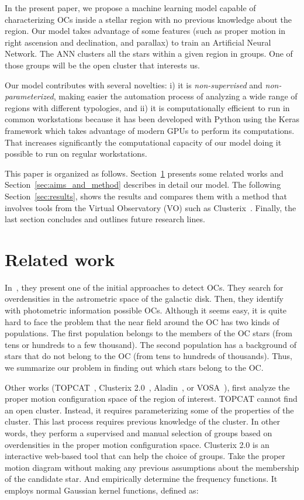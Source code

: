\documentclass[11pt,a4paper,english,twocolumn]{article}
\begin{document}
In the present paper, we propose a machine learning model capable of characterizing
OCs inside a stellar region with no previous knowledge about the region.
Our model takes advantage of some features (such as proper motion in right ascension
and declination, and parallax) to train an Artificial Neural Network.
The ANN clusters all the stars within a given region in groups.
One of those groups will be the open cluster that interests us.

Our model contributes with several novelties: i) it is \emph{non-supervised} and
\emph{non-parameterized}, making easier the automation process of analyzing a
wide range of regions with different typologies, and ii) it is computationally
efficient to run in common workstations because it has been developed with
Python using the Keras framework which takes advantage of modern GPUs to perform
its computations. That increases significantly the computational capacity of
our model doing it possible to run on regular workstations.

This paper is organized as follows. Section~\ref{sec:related_works} presents
some related works and Section~\ref{sec:aims_and_method} describes in detail
our model. The following Section~\ref{sec:results}, shows the results and compares
them with a method that involves tools from the Virtual Observatory (VO) such as
Clusterix~\cite{balaguer2020clusterix}. Finally, the last section concludes and
outlines future research lines.

\section{Related work}
\label{sec:related_works}

In~\cite{castro2020hunting}, they present one of the initial approaches to detect OCs.
They search for overdensities in the astrometric space of the galactic disk. Then,
they identify with photometric information possible OCs. Although it seems easy,
it is quite hard to face the problem that the near field around the OC has two kinds of
populations. The first population belongs to the members of the OC stars (from tens or
hundreds to a few thousand). The second population has a background of stars that do
not belong to the OC (from tens to hundreds of thousands). Thus, we summarize our problem
in finding out which stars belong to the OC.

Other works (TOPCAT~\cite{taylor2005topcat}, Clusterix 2.0~\cite{balaguer2020clusterix},
Aladin~\cite{bonnarel2000aladin}, or VOSA~\cite{bayo2008vosa}), first analyze the proper
motion configuration space of the region of interest. TOPCAT cannot find an open cluster.
Instead, it requires parameterizing some of the properties of the cluster. This last
process requires previous knowledge of the cluster. In other words, they perform a supervised
and manual selection of groups based on overdensities in the proper motion configuration space.
Clusterix 2.0 is an interactive web-based tool that can help the choice of groups. Take the
proper motion diagram without making any previous assumptions about the membership of the
candidate star. And empirically determine the frequency functions. It employs normal Gaussian
kernel functions, defined as:
\end{document}
